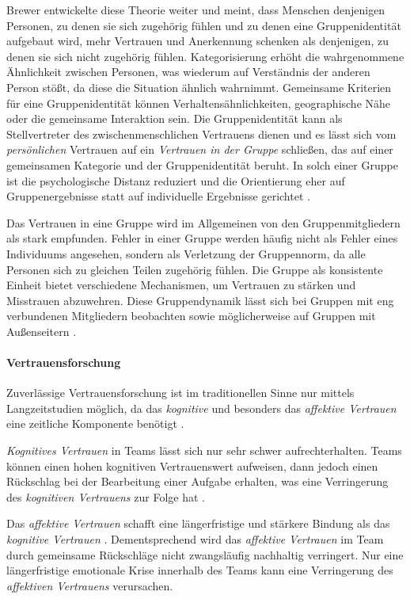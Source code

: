 \documentclass[a4paper,11pt]{article}%
\renewcommand{\\}{\vspace*{0.5\baselineskip} \newline}
\begin{document}
Brewer \citep{brewer1981} entwickelte diese Theorie weiter und meint, dass Menschen denjenigen Personen, zu denen sie sich zugehörig fühlen und zu denen eine Gruppenidentität aufgebaut wird, mehr Vertrauen und Anerkennung schenken als denjenigen, zu denen sie sich nicht zugehörig fühlen. Kategorisierung erhöht die wahrgenommene Ähnlichkeit zwischen Personen, was wiederum auf Verständnis der anderen Person stößt, da diese die Situation ähnlich wahrnimmt.
Gemeinsame Kriterien für eine Gruppenidentität können Verhaltensähnlichkeiten, geographische Nähe oder die gemeinsame Interaktion sein. Die Gruppenidentität kann als Stellvertreter des zwischenmenschlichen Vertrauens dienen und es lässt sich vom \textit{persönlichen} Vertrauen auf ein \textit{Vertrauen in der Gruppe} schließen, das auf einer gemeinsamen Kategorie und der Gruppenidentität beruht.
In solch einer Gruppe ist die psychologische Distanz reduziert und die Orientierung eher auf Gruppenergebnisse statt auf individuelle Ergebnisse gerichtet \citep[355-360]{brewer1981}.

Das Vertrauen in eine Gruppe wird im Allgemeinen von den Gruppenmitgliedern als stark empfunden. Fehler in einer Gruppe werden häufig nicht als Fehler eines Individuums angesehen, sondern als Verletzung der Gruppennorm, da alle Personen sich zu gleichen Teilen zugehörig fühlen. Die Gruppe als konsistente Einheit bietet verschiedene Mechanismen, um Vertrauen zu stärken und Misstrauen abzuwehren. Diese Gruppendynamik lässt sich bei Gruppen mit eng verbundenen Mitgliedern beobachten sowie möglicherweise auf Gruppen mit Außenseitern \citep[397-403]{stolle2002trusting}.

\paragraph{Vertrauensforschung}
\label{Vertrauensforschung}
Zuverlässige Vertrauensforschung ist im traditionellen Sinne nur mittels Langzeitstudien möglich, da das \textit{kognitive} und besonders das \textit{affektive Vertrauen} eine zeitliche Komponente benötigt \citep{jones1998experience}.

\textit{Kognitives Vertrauen} in Teams lässt sich nur sehr schwer aufrechterhalten. Teams können einen hohen kognitiven Vertrauenswert aufweisen, dann jedoch einen Rückschlag bei der Bearbeitung einer Aufgabe erhalten, was eine Verringerung des \textit{kognitiven Vertrauens} zur Folge hat \citep[S. 29-31]{mcallister1995affect}.

Das \textit{affektive Vertrauen} schafft eine längerfristige und stärkere Bindung als das \textit{kognitive Vertrauen} \citep[S. 29-31]{mcallister1995affect}.
Dementsprechend wird das \textit{affektive Vertrauen} im Team durch gemeinsame Rückschläge nicht zwangsläufig nachhaltig verringert. Nur eine längerfristige emotionale Krise innerhalb des Teams kann eine Verringerung des \textit{affektiven Vertrauens} verursachen. 
\end{document}
